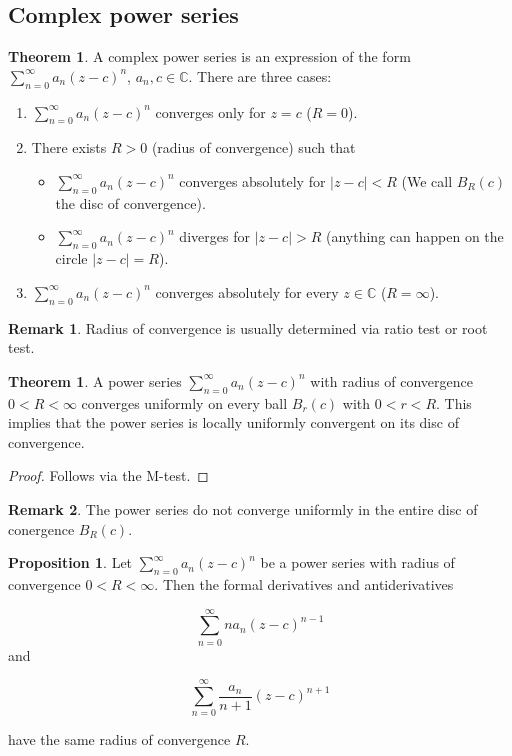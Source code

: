 \documentclass[12pt,a4paper]{article}
\theoremstyle{definition}
\newtheorem{theorem}[definition]{Theorem}
\newtheorem{proposition}[definition]{Proposition}
\newtheorem*{remark}{Remark}
\begin{document}
\subsection{Complex power series}

\begin{theorem}
	A complex power series is an expression of the form $\sum_{n = 0}^{\infty} a_n (z - c)^n$, $a_n, c \in \mathbb{C}$. There are three cases:

	\begin{enumerate}
		\item $\sum_{n = 0}^{\infty} a_n (z - c)^n$ converges only for $z = c$ ($R = 0$).
		\item There exists $R > 0$ (radius of convergence) such that
		\begin{itemize}
			\item $\sum_{n = 0}^{\infty} a_n (z - c)^n$ converges absolutely for $|z - c| < R$ (We call $B_R(c)$ the disc of convergence).
			\item $\sum_{n = 0}^{\infty} a_n (z - c)^n$ diverges for $|z - c| > R$ (anything can happen on the circle $|z - c| = R$).
		\end{itemize}
		\item $\sum_{n = 0}^{\infty} a_n (z - c)^n$ converges absolutely for every $z \in \mathbb{C}$ ($R = \infty$).
	\end{enumerate}
\end{theorem}

\begin{remark}
	Radius of convergence is usually determined via ratio test or root test.
\end{remark}

\begin{theorem}
	A power series $\sum_{n = 0}^{\infty} a_n (z - c)^n$ with radius of convergence $0 < R < \infty$ converges uniformly on every ball $B_r(c)$ with $0 < r < R$. This implies that the power series is locally uniformly convergent on its disc of convergence.
\end{theorem}

\begin{proof}
	Follows via the M-test.
\end{proof}

\begin{remark}
	The power series do not converge uniformly in the entire disc of conergence $B_R(c)$.
\end{remark}

\begin{proposition}
	Let $\sum_{n = 0}^{\infty} a_n (z - c)^n$ be a power series with radius of convergence $0 < R < \infty$. Then the formal derivatives and antiderivatives

	\[\sum_{n = 0}^{\infty} n a_n (z - c)^{n - 1}\] and

	\[\sum_{n = 0}^{\infty} \frac{a_n}{n + 1} (z - c)^{n + 1}\]

	have the same radius of convergence $R$.
\end{proposition}
\end{document}
